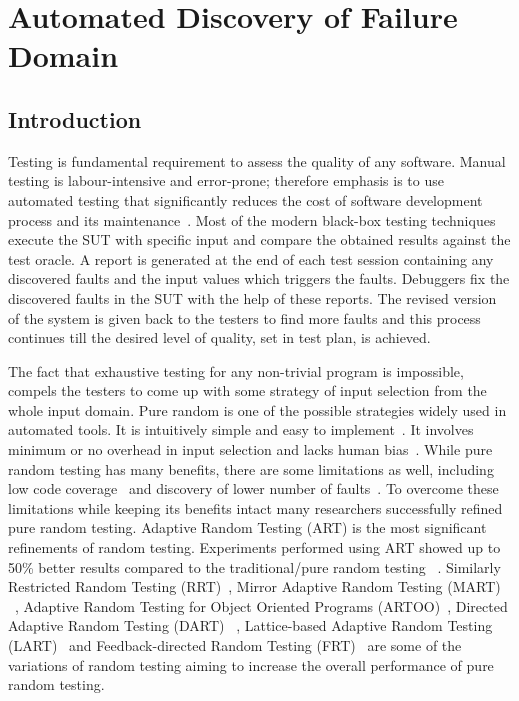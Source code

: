 \chapter{Automated Discovery of Failure Domain}
\label{chap:ADFD}

\section{Introduction}\label{sec:intro5}
Testing is fundamental requirement to assess the quality of any software. Manual testing is labour-intensive and error-prone; therefore emphasis is to use automated testing that significantly reduces the cost of software development process and its maintenance~\cite{beizer1995black}. Most of the modern black-box testing techniques execute the SUT with specific input and compare the obtained results against the test oracle. A report is generated at the end of each test session containing any discovered faults and the input values which triggers the faults. Debuggers fix the discovered faults in the SUT with the help of these reports. The revised version of the system is given back to the testers to find more faults and this process continues till the desired level of quality, set in test plan, is achieved.

The fact that exhaustive testing for any non-trivial program is impossible, compels the testers to come up with some strategy of input selection from the whole input domain. Pure random is one of the possible strategies widely used in automated tools. It is intuitively simple and easy to implement~\cite{Ciupa2008, Forrester2000}. It involves minimum or no overhead in input selection and lacks human bias~\cite{hamlet1994, Linger1993}. While pure random testing has many benefits, there are some limitations as well, including low code coverage~\cite{Offutt1996} and discovery of lower number of faults~\cite{Chen1994}. To overcome these limitations while keeping its benefits intact many researchers successfully refined pure random testing. Adaptive Random Testing (ART) is the most significant refinements of random testing. Experiments performed using ART showed up to 50\% better results compared to the traditional/pure random testing ~\cite{Chen2008}.  Similarly Restricted Random Testing (RRT)~\cite{Chan2002}, Mirror Adaptive Random Testing (MART) ~\cite{Chen2004}, Adaptive Random Testing for Object Oriented Programs (ARTOO)~\cite{Ciupa2008}, Directed Adaptive Random Testing (DART) ~\cite{Godefroid2005}, Lattice-based Adaptive Random Testing (LART)~\cite{Mayer2005} and Feedback-directed Random Testing (FRT)~\cite{Pacheco2007} are some of the variations of random testing aiming to increase the overall performance of pure random testing.

